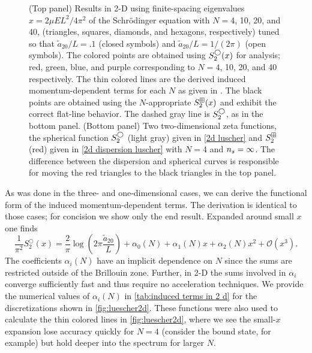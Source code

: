 \begin{figure}
    \center
    
    \caption{
        (Top panel)
        Results in 2-D using finite-spacing eigenvalues $x=2\mu EL^2/4\pi^2$ of the Schr\"odinger equation with $N=4$, 10, 20, and 40, (triangles, squares, diamonds, and hexagons, respectively) tuned so that $\tilde a_{20}/L=.1$ (closed symbols) and $\tilde a_{20}/L=1/(2\pi)$ (open symbols).
        The colored points are obtained using $S^\bigcirc_2(x)$ for analysis; red, green, blue, and purple corresponding to $N=4$, 10, 20, and 40 respectively.
        The thin colored lines are the derived induced momentum-dependent terms for each $N$ as given in .
        The black points are obtained using the $N$-appropriate $S^{\boxplus}_2(x)$ and exhibit the correct flat-line behavior.
        The dashed gray line is $S_2^\bigcirc$, as in the bottom panel.
        (Bottom panel)
        Two two-dimensional zeta functions, the spherical function $S_2^{\bigcirc}$ (light gray) given in \eqref{2d luscher} and $S_2^{\boxplus}$ (red) given in \eqref{2d dispersion luscher} with $N=4$ and ${n_s}=\infty$.
        The difference between the dispersion and spherical curves is responsible for moving the red triangles to the black triangles in the top panel.
        }
    \label{fig:luescher2d}
\end{figure}

As was done in the three- and one-dimensional cases, we can derive the functional form of the induced momentum-dependent terms.
The derivation is identical to those cases; for concision we show only the end result.
Expanded around small $x$ one finds
\begin{equation}
    \label{eq:2D corrections}
    \frac{1}{ \pi^{2}} S^\bigcirc_{2}\left(x\right)
    =
    \frac{2}{\pi}\log\left(2\pi \frac{\tilde a_{20}}{L}\right)
    + \alpha_0(N)
    + \alpha_1(N) x
    + \alpha_2(N) x^2
    + \mathcal{O}(x^3).
\end{equation}
The coefficients $\alpha_i(N)$ have an implicit dependence on $N$ since the sums are restricted outside of the Brillouin zone.  Further, in 2-D the sums involved in $\alpha_i$ converge sufficiently fast and thus require no acceleration techniques.
We provide the numerical values of $\alpha_i(N)$ in \autoref{tab:induced terms in 2 d} for the discretizations shown in \autoref{fig:luescher2d}.
These functions were also used to calculate the thin colored lines in \autoref{fig:luescher2d}, where we see the small-$x$ expansion lose accuracy quickly for $N=4$ (consider the bound state, for example) but hold deeper into the spectrum for larger $N$.

